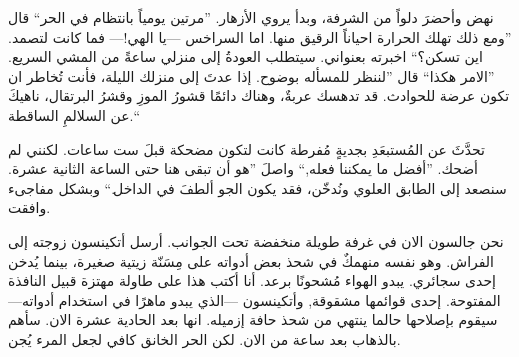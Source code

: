 \documentclass[12pt, a4paper]{article}
\begin{document}
\begin{otherlanguage}{arabic}
نهض وأحضرَ دلواً من الشرفة، وبدأ يروي الأزهار.  ”مرتين يومياً بانتظام في الحر“  قال ”ومع ذلك تهلك الحرارة احياناً الرقيق منها.
اما السراخس —يا الهي!— فما كانت لتصمد. اين تسكن؟“  اخبرته بعنواني. سيتطلب العودةُ إلى منزلي ساعةً من المشي السريع.
”الامر هكذا“ قال  ”لننظر للمسأله بوضوح.  إذا عدتَ إلى منزلك الليلة، فأنت تُخاطر ان تكون عرضة للحوادث. قد تدهسك عربةٌ، وهناك دائمًا 
قشورُ الموزِ وقشرُ البرتقال، ناهيكَ عن السلالمِ الساقطة.“  \medbreak

تحدَّثَ عن المُستبعَدِ بجديةٍ مُفرطة كانت لتكون مضحكة قبلَ ست ساعات. لكنني لم أضحك.
”أفضل ما يمكننا فعله,“ واصلَ ”هو أن تبقى هنا حتى الساعة الثانية عشرة. سنصعد إلى الطابق العلوي ونُدخّن، فقد يكون الجو ألطفَ في الداخل.“ 
وبشكل مفاجىء وافقت. \medbreak

نحن جالسون الان في غرفة طويلة منخفضة تحت الجوانب.  أرسل أتكينسون زوجته إلى الفراش.
وهو نفسه منهمكٌ في شحذ بعض أدواته على مِسَنّة زيتية صغيرة، بينما يُدخن إحدى سجائري.
يبدو الهواء مُشحونًا برعد. أنا أكتب هذا على طاولة مهتزة قبيل النافذة المفتوحة. إحدى قوائمها مشقوقة, وأتكينسون 
 —الذي يبدو ماهرًا في استخدام أدواته— سيقوم بإصلاحها حالما ينتهي من شحذ حافة إزميله.
انها بعد الحادية عشرة الان. سأهم بالذهاب بعد ساعة من الان.
لكن الحر الخانق كافي لجعل المرء يُجن. \vspace{3em}




\end{otherlanguage}

  
\end{document}
